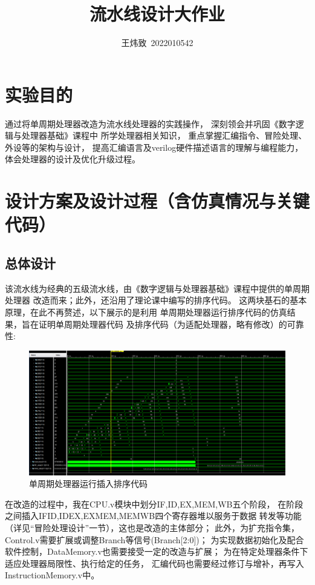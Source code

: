 \documentclass[10pt]{article}
\title{流水线设计大作业}
\author{王炜致\ 2022010542}
\date{}
\begin{document}
\maketitle
\tableofcontents
\section{实验目的}
通过将单周期处理器改造为流水线处理器的实践操作，
深刻领会并巩固《数字逻辑与处理器基础》课程中
所学处理器相关知识，
重点掌握汇编指令、冒险处理、外设等的架构与设计，
提高汇编语言及verilog硬件描述语言的理解与编程能力，
体会处理器的设计及优化升级过程。

\section{设计方案及设计过程（含仿真情况与关键代码）}
\subsection{总体设计}
该流水线为经典的五级流水线，由《数字逻辑与处理器基础》课程中提供的单周期处理器
改造而来；此外，还沿用了理论课中编写的排序代码。
这两块基石的基本原理，在此不再赘述，以下展示的是利用
单周期处理器运行排序代码的仿真结果，旨在证明单周期处理器代码
及排序代码（为适配处理器，略有修改）的可靠性:

\begin{figure}[H]
    \centering
    \includegraphics[scale=0.35]{MUCHOGUSTO.png}
    \caption{单周期处理器运行插入排序代码}
    \end{figure}

在改造的过程中，我在CPU.v模块中划分IF,ID,EX,MEM,WB五个阶段，
在阶段之间插入IFID,IDEX,EXMEM,MEMWB四个寄存器堆以服务于数据
转发等功能（详见“冒险处理设计”一节），这也是改造的主体部分；
此外，为扩充指令集，Control.v需要扩展或调整Branch等信号(Branch[2:0])；
为实现数据初始化及配合软件控制，DataMemory.v也需要接受一定的改造与扩展；
为在特定处理器条件下适应处理器局限性、执行给定的任务，
汇编代码也需要经过修订与增补，再写入InstructionMemory.v中。
\end{document}
